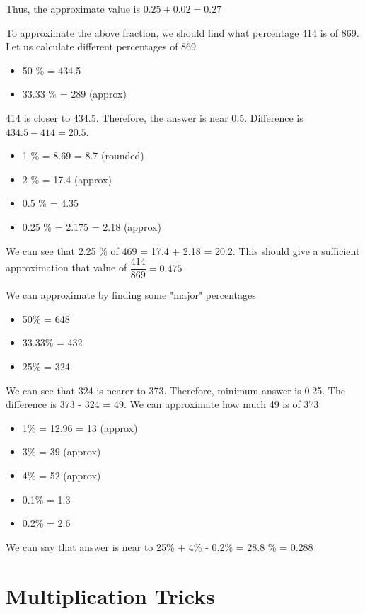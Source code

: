 Thus, the approximate value is $0.25 + 0.02 = 0.27$


To approximate the above fraction, we should find what percentage 414 is of 869. Let us calculate different percentages of 869
\begin{itemize}
    \item 50 \% = 434.5
    \item 33.33 \% = 289 (approx)
\end{itemize}

414 is closer to 434.5. Therefore, the answer is near 0.5. Difference is $434.5 - 414 = 20.5$. 
\begin{itemize}
    \item 1 \% = 8.69 = 8.7 (rounded)
    \item 2 \% = 17.4 (approx)
    \item 0.5 \% = 4.35 
    \item 0.25 \% = 2.175 = 2.18 (approx)
\end{itemize}

We can see that 2.25 \% of 469 = 17.4 + 2.18 = 20.2. This should give a sufficient approximation that value of $\dfrac{414}{869} = 0.475$ \\


We can approximate by finding some "major" percentages
\begin{itemize}
    \item 50\% = 648
    \item 33.33\% = 432
    \item 25\% = 324
\end{itemize}

We can see that 324 is nearer to 373. Therefore, minimum answer is 0.25. The difference is 373 - 324 = 49. We can approximate how much 49 is of 373
\begin{itemize}
    \item 1\% = 12.96 = 13 (approx)
    \item 3\% = 39 (approx)
    \item 4\% = 52 (approx)
    \item 0.1\% = 1.3 
    \item 0.2\% = 2.6
\end{itemize}

We can say that answer is near to 25\% + 4\% - 0.2\% = 28.8 \% = 0.288


\section{Multiplication Tricks}
